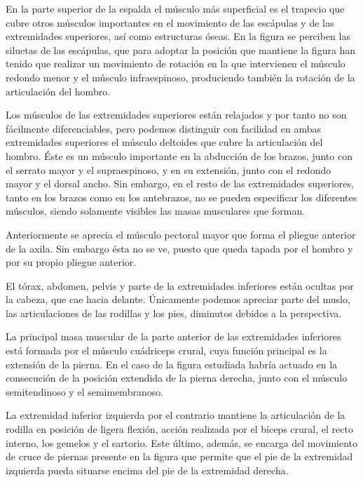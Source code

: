 En la parte superior de la espalda el músculo más superficial es el trapecio que cubre otros músculos importantes en el movimiento de las escápulas y de las extremidades superiores, así como estructuras óseas. En la figura se perciben las siluetas de las escápulas, que para adoptar la posición que mantiene la figura han tenido que realizar un movimiento de rotación en la que intervienen el músculo redondo menor y el músculo infraespinoso, produciendo también la rotación de la articulación del hombro.

Los músculos de las extremidades superiores están relajados y por tanto no son fácilmente diferenciables, pero podemos distinguir con facilidad en ambas extremidades superiores el músculo deltoides que cubre la articulación del hombro. Éste es un músculo importante en la abducción de los brazos, junto con el serrato mayor y el supraespinoso, y en su extensión, junto con el redondo mayor y el dorsal ancho. Sin embargo, en el resto de las extremidades superiores, tanto en los brazos como en los antebrazos, no se pueden especificar los diferentes músculos, siendo solamente visibles las masas musculares que forman.

Anteriormente se aprecia el músculo pectoral mayor que forma el pliegue anterior de la axila. Sin embargo ésta no se ve, puesto que queda tapada por el hombro y por su propio pliegue anterior.

El tórax, abdomen, pelvis y parte de la extremidades inferiores están ocultas por la cabeza, que cae hacia delante. Únicamente podemos apreciar parte del muslo, las articulaciones de las rodillas y los pies, diminutos debidos a la perspectiva.

La principal masa muscular de la parte anterior de las extremidades inferiores está formada por el músculo cuádriceps crural, cuya función principal es la extensión de la pierna. En el caso de la figura estudiada habría actuado en la consecución de la posición extendida de la pierna derecha, junto con el músculo semitendinoso y el semimembranoso.

La extremidad inferior izquierda por el contrario mantiene la articulación de la rodilla en posición de ligera flexión, acción realizada por el bíceps crural, el recto interno, los gemelos y el sartorio. Este último, además, se encarga del movimiento de cruce de piernas presente en la figura que permite que el pie de la extremidad izquierda pueda situarse encima del pie de la extremidad derecha.



